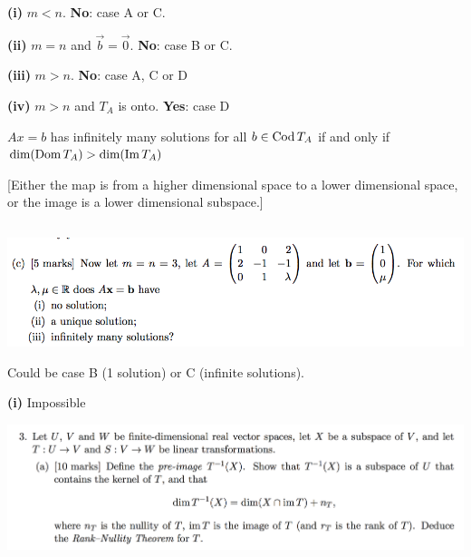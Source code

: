 \documentclass[12pt]{article}
\begin{document}
\textbf{(i)} $m < n$. \textbf{No}: case A or C.


\textbf{(ii)} $m = n$ and $\vec b = \vec 0$. \textbf{No}: case B or C.


\textbf{(iii)} $m > n$. \textbf{No}: case A, C or D


\textbf{(iv)} $m > n$ and $T_A$ is onto. \textbf{Yes}: case D

\begin{lemma*}
  $Ax = b$ has infinitely many solutions for all $b \in \operatorname{\mathrm{Cod}} T_A$ if and only
  if $\dim(\operatorname{\mathrm{Dom}} T_A) > \dim(\operatorname{\mathrm{Im}} T_A)$
\end{lemma*}

[Either the map is from a higher dimensional space to a lower dimensional
space, or the image is a lower dimensional subspace.]


\subsection*{} %
\begin{mdframed}
\includegraphics[width=400pt]{img/oxford-prelims-2017-A-2-3.png}
\end{mdframed}

Could be case B (1 solution) or C (infinite solutions).

\textbf{(i)} Impossible

\newpage
\begin{mdframed}
\includegraphics[width=400pt]{img/oxford-prelims-2017-A-3-1.png}
\end{mdframed}
\end{document}
